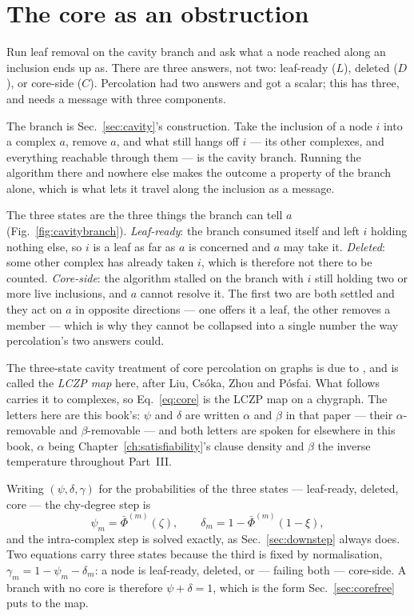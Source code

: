 \section{The core as an obstruction}
\label{sec:coreobstruction}

Run leaf removal on the cavity branch and ask what a node reached along an
inclusion ends up as. There are three answers, not two: leaf-ready ($L$),
deleted ($D$), or core-side ($C$). Percolation had two answers and got a scalar;
this has three, and needs a message with three components.

The branch is Sec.~\ref{sec:cavity}'s construction. Take the inclusion of a node
$i$ into a complex $a$, remove $a$, and what still hangs off $i$ --- its other
complexes, and everything reachable through them --- is the cavity branch.
Running the algorithm there and nowhere else makes the outcome a property of the
branch alone, which is what lets it travel along the inclusion as a message.

The three states are the three things the branch can tell $a$
(Fig.~\ref{fig:cavitybranch}).
\emph{Leaf-ready}: the branch consumed itself and left $i$ holding nothing else,
so $i$ is a leaf as far as $a$ is concerned and $a$ may take it.
\emph{Deleted}: some other complex has already taken $i$, which is therefore
not there to be counted. \emph{Core-side}: the algorithm stalled on the branch
with $i$ still holding two or more live inclusions, and $a$ cannot resolve it.
The first two are both settled and they act on $a$ in opposite directions --- one
offers it a leaf, the other removes a member --- which is why they cannot be
collapsed into a single number the way percolation's two answers could.

The three-state cavity treatment of core percolation on graphs is due to
\citet{liu2012}, and is called the \emph{LCZP map} here, after Liu, Cs\'oka,
Zhou and P\'osfai. What follows carries it to complexes, so
Eq.~\eqref{eq:core} is the LCZP map on a chygraph. The letters here are
this book's: $\psi$ and $\delta$ are written $\alpha$ and $\beta$ in that paper
--- their $\alpha$-removable and $\beta$-removable --- and both letters are
spoken for elsewhere in this book, $\alpha$ being
Chapter~\ref{ch:satisfiability}'s clause density and $\beta$ the inverse
temperature throughout Part~III.

Writing $(\psi,\delta,\gamma)$ for the probabilities of the three states
--- leaf-ready, deleted, core --- the chy-degree step is
\begin{equation}
  \psi_{m}=\bar\Phi^{(m)}(\zeta),
  \qquad
  \delta_{m}=1-\bar\Phi^{(m)}(1-\xi),
  \label{eq:core}
\end{equation}
and the intra-complex step is solved exactly, as Sec.~\ref{sec:downstep} always
does. Two equations carry three states because the third is fixed by
normalisation, $\gamma_{m}=1-\psi_{m}-\delta_{m}$: a node is leaf-ready,
deleted, or --- failing both --- core-side. A branch with no core is therefore
$\psi+\delta=1$, which is the form Sec.~\ref{sec:corefree} puts to the map.

